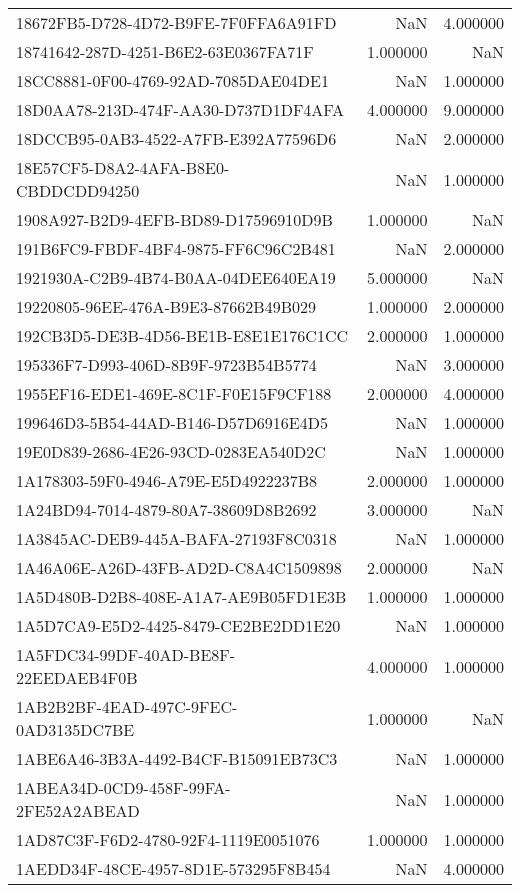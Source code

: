 \begin{tabular}{lrr}
18672FB5-D728-4D72-B9FE-7F0FFA6A91FD & NaN & 4.000000 \\
18741642-287D-4251-B6E2-63E0367FA71F & 1.000000 & NaN \\
18CC8881-0F00-4769-92AD-7085DAE04DE1 & NaN & 1.000000 \\
18D0AA78-213D-474F-AA30-D737D1DF4AFA & 4.000000 & 9.000000 \\
18DCCB95-0AB3-4522-A7FB-E392A77596D6 & NaN & 2.000000 \\
18E57CF5-D8A2-4AFA-B8E0-CBDDCDD94250 & NaN & 1.000000 \\
1908A927-B2D9-4EFB-BD89-D17596910D9B & 1.000000 & NaN \\
191B6FC9-FBDF-4BF4-9875-FF6C96C2B481 & NaN & 2.000000 \\
1921930A-C2B9-4B74-B0AA-04DEE640EA19 & 5.000000 & NaN \\
19220805-96EE-476A-B9E3-87662B49B029 & 1.000000 & 2.000000 \\
192CB3D5-DE3B-4D56-BE1B-E8E1E176C1CC & 2.000000 & 1.000000 \\
195336F7-D993-406D-8B9F-9723B54B5774 & NaN & 3.000000 \\
1955EF16-EDE1-469E-8C1F-F0E15F9CF188 & 2.000000 & 4.000000 \\
199646D3-5B54-44AD-B146-D57D6916E4D5 & NaN & 1.000000 \\
19E0D839-2686-4E26-93CD-0283EA540D2C & NaN & 1.000000 \\
1A178303-59F0-4946-A79E-E5D4922237B8 & 2.000000 & 1.000000 \\
1A24BD94-7014-4879-80A7-38609D8B2692 & 3.000000 & NaN \\
1A3845AC-DEB9-445A-BAFA-27193F8C0318 & NaN & 1.000000 \\
1A46A06E-A26D-43FB-AD2D-C8A4C1509898 & 2.000000 & NaN \\
1A5D480B-D2B8-408E-A1A7-AE9B05FD1E3B & 1.000000 & 1.000000 \\
1A5D7CA9-E5D2-4425-8479-CE2BE2DD1E20 & NaN & 1.000000 \\
1A5FDC34-99DF-40AD-BE8F-22EEDAEB4F0B & 4.000000 & 1.000000 \\
1AB2B2BF-4EAD-497C-9FEC-0AD3135DC7BE & 1.000000 & NaN \\
1ABE6A46-3B3A-4492-B4CF-B15091EB73C3 & NaN & 1.000000 \\
1ABEA34D-0CD9-458F-99FA-2FE52A2ABEAD & NaN & 1.000000 \\
1AD87C3F-F6D2-4780-92F4-1119E0051076 & 1.000000 & 1.000000 \\
1AEDD34F-48CE-4957-8D1E-573295F8B454 & NaN & 4.000000 \\

\end{tabular}

